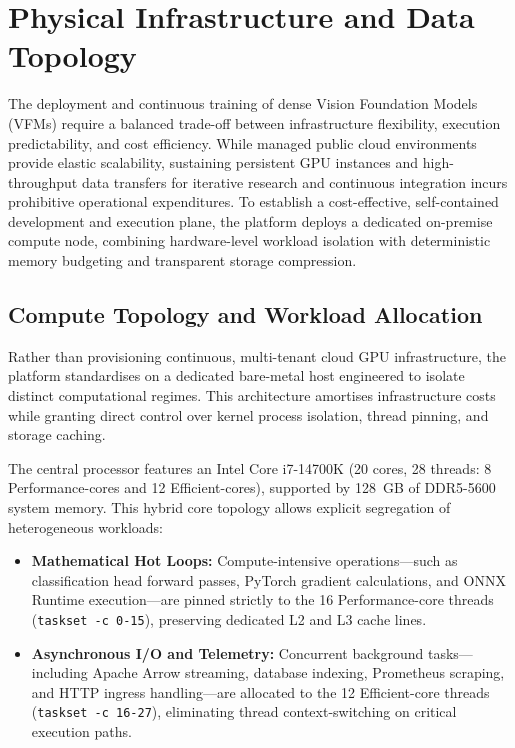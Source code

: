 \chapter{Physical Infrastructure and Data Topology}
\label{ch:infrastructure_topology}

The deployment and continuous training of dense Vision Foundation Models (VFMs) require a balanced trade-off between infrastructure flexibility, execution predictability, and cost efficiency. While managed public cloud environments provide elastic scalability, sustaining persistent GPU instances and high-throughput data transfers for iterative research and continuous integration incurs prohibitive operational expenditures. To establish a cost-effective, self-contained development and execution plane, the platform deploys a dedicated on-premise compute node, combining hardware-level workload isolation with deterministic memory budgeting and transparent storage compression.

\section{Compute Topology and Workload Allocation}

Rather than provisioning continuous, multi-tenant cloud GPU infrastructure, the platform standardises on a dedicated bare-metal host engineered to isolate distinct computational regimes. This architecture amortises infrastructure costs while granting direct control over kernel process isolation, thread pinning, and storage caching.

The central processor features an Intel Core i7-14700K (20 cores, 28 threads: 8 Performance-cores and 12 Efficient-cores), supported by 128~GB of DDR5-5600 system memory. This hybrid core topology allows explicit segregation of heterogeneous workloads:
\begin{itemize}
    \item \textbf{Mathematical Hot Loops:} Compute-intensive operations---such as classification head forward passes, PyTorch gradient calculations, and ONNX Runtime execution---are pinned strictly to the 16 Performance-core threads (\texttt{taskset -c 0-15}), preserving dedicated L2 and L3 cache lines.
    \item \textbf{Asynchronous I/O and Telemetry:} Concurrent background tasks---including Apache Arrow streaming, database indexing, Prometheus scraping, and HTTP ingress handling---are allocated to the 12 Efficient-core threads (\texttt{taskset -c 16-27}), eliminating thread context-switching on critical execution paths.
\end{itemize}

